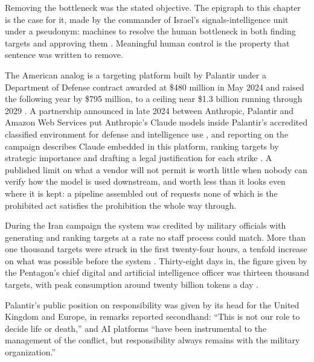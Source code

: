 Removing the bottleneck was the stated objective. The epigraph to this chapter is the case for it, made by the commander of Israel's signals-intelligence unit under a pseudonym: machines to resolve the human bottleneck in both finding targets and approving them \autocite{ys2021humanmachine}. Meaningful human control is the property that sentence was written to remove.

\begin{esbox}
The American analog is a targeting platform built by Palantir under a Department of Defense contract awarded at \$480 million in May 2024 and raised the following year by \$795 million, to a ceiling near \$1.3 billion running through 2029 \autocite{defensescoop2025maven}. A partnership announced in late 2024 between Anthropic, Palantir and Amazon Web Services put Anthropic's Claude models inside Palantir's accredited classified environment for defense and intelligence use \autocite{wiggers2024anthropic}, and reporting on the campaign describes Claude embedded in this platform, ranking targets by strategic importance and drafting a legal justification for each strike \autocite{livingstone2026maven}. A published limit on what a vendor will not permit is worth little when nobody can verify how the model is used downstream, and worth less than it looks even where it is kept: a pipeline assembled out of requests none of which is the prohibited act satisfies the prohibition the whole way through.

During the Iran campaign the system was credited by military officials with generating and ranking targets at a rate no staff process could match. More than one thousand targets were struck in the first twenty-four hours, a tenfold increase on what was possible before the system \autocite{csis2026maven}. Thirty-eight days in, the figure given by the Pentagon's chief digital and artificial intelligence officer was thirteen thousand targets, with peak consumption around twenty billion tokens a day \autocite{breakingdefense2026maven}.

Palantir's public position on responsibility was given by its head for the United Kingdom and Europe, in remarks reported secondhand: “This is not our role to decide life or death,” and AI platforms “have been instrumental to the management of the conflict, but responsibility always remains with the military organization.” \autocite{lee2026palantir}

\end{esbox}
